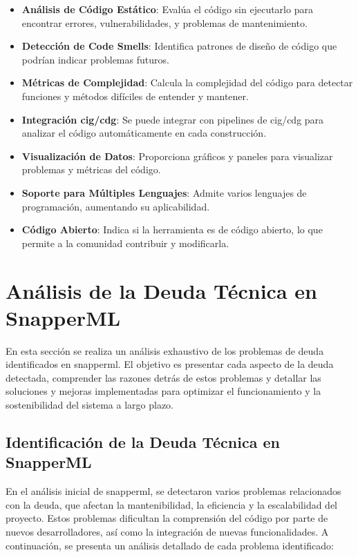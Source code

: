 \begin{itemize}
    \item \textbf{Análisis de Código Estático}: Evalúa el código sin ejecutarlo para encontrar errores, vulnerabilidades, y problemas de mantenimiento.
    \item \textbf{Detección de Code Smells}: Identifica patrones de diseño de código que podrían indicar problemas futuros.
    \item \textbf{Métricas de Complejidad}: Calcula la complejidad del código para detectar funciones y métodos difíciles de entender y mantener.
    \item \textbf{Integración \Gls{cig}/\Gls{cdg}}: Se puede integrar con pipelines de \Gls{cig}/\Gls{cdg} para analizar el código automáticamente en cada construcción.
    \item \textbf{Visualización de Datos}: Proporciona gráficos y paneles para visualizar problemas y métricas del código.
    \item \textbf{Soporte para Múltiples Lenguajes}: Admite varios lenguajes de programación, aumentando su aplicabilidad.
    \item \textbf{Código Abierto}: Indica si la herramienta es de código abierto, lo que permite a la comunidad contribuir y modificarla.
\end{itemize}
\section{Análisis de la Deuda Técnica en SnapperML}
En esta sección se realiza un análisis exhaustivo de los problemas de \gls{deuda} identificados en \Gls{snapperml}. El objetivo es presentar cada aspecto de la \gls{deuda} detectada, comprender las razones detrás de estos problemas y detallar las soluciones y mejoras implementadas para optimizar el funcionamiento y la sostenibilidad del sistema a largo plazo.

\subsection{Identificación de la Deuda Técnica en SnapperML}
En el análisis inicial de \Gls{snapperml}, se detectaron varios problemas relacionados con la \gls{deuda}, que afectan la mantenibilidad, la eficiencia y la escalabilidad del proyecto. Estos problemas dificultan la comprensión del código por parte de nuevos desarrolladores, así como la integración de nuevas funcionalidades. A continuación, se presenta un análisis detallado de cada problema identificado:

